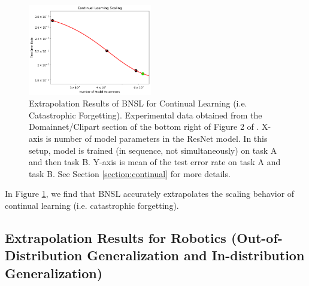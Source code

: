 \documentclass{article} %
\begin{document}
\begin{figure}[htbp]
    \centering
\includegraphics[width=0.48\textwidth]{figures/continual_learning/continual_vision.png}

    \caption{
Extrapolation Results of BNSL for Continual Learning (i.e. Catastrophic Forgetting). Experimental data obtained from the Domainnet/Clipart section of the bottom right of Figure 2 of \citep{ramasesh2022effect}. X-axis is number of model parameters in the ResNet model. In this setup, model is trained (in sequence, not simultaneously) on task A and then task B. Y-axis is mean of the test error rate on task A and task B. See Section \ref{section:continual} for more details.
    }
    \label{fig:continual}
\end{figure}

In Figure \ref{fig:continual}, we find that BNSL accurately extrapolates the scaling behavior of continual learning (i.e. catastrophic forgetting).

\clearpage

\subsection{Extrapolation Results for Robotics (Out-of-Distribution Generalization and In-distribution Generalization)}
\label{section:robot}
\end{document}
